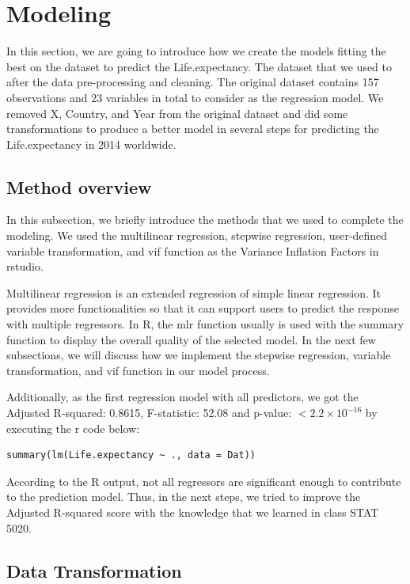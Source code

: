 \section{Modeling}
\label{sec:modeling}

In this section, we are going to introduce how we create the models fitting the best on the dataset to predict the Life.expectancy. The dataset that we used to after the data pre-processing and cleaning. The original dataset contains 157 observations and 23 variables in total to consider as the regression model. We removed X, Country, and Year from the original dataset and did some transformations to produce a better model in several steps for predicting the Life.expectancy in 2014 worldwide.

\subsection{Method overview}

In this subsection, we briefly introduce the methods that we used to complete the modeling. We used the multilinear regression, stepwise regression, user-defined variable transformation, and vif function as the Variance Inflation Factors in rstudio.

Multilinear regression is an extended regression of simple linear regression. It provides more functionalities so that it can support users to predict the response with multiple regressors. In R, the mlr function usually is used with the summary function to display the overall quality of the selected model. In the next few subsections, we will discuss how we implement the stepwise regression, variable transformation, and vif function in our model process.

Additionally, as the first regression model with all predictors, we got the Adjusted R-squared: 0.8615, F-statistic: 52.08 and p-value: $< 2.2\times 10^{-16}$ by executing the r code below:

\begin{verbatim}
summary(lm(Life.expectancy ~ ., data = Dat))
\end{verbatim}

According to the R output, not all regressors are significant enough to contribute to the prediction model. Thus, in the next steps, we tried to improve the Adjusted R-squared score with the knowledge that we learned in class STAT 5020.

\subsection{Data Transformation}


